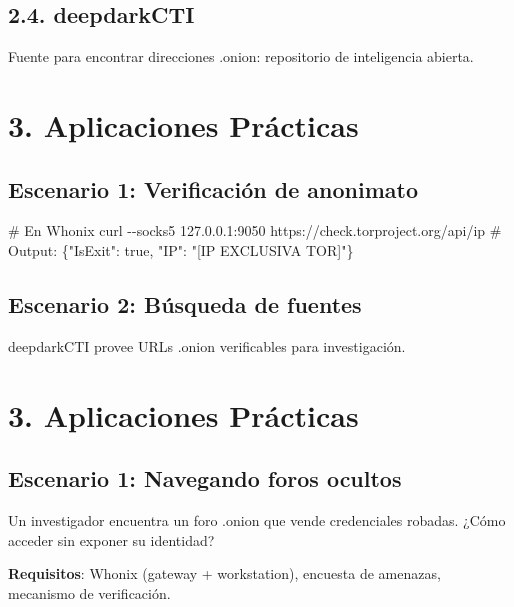 \documentclass[
  letterpaper,
]{report}
\newenvironment{Shaded}{\begin{snugshade}}{\end{snugshade}}
\newcommand{\AttributeTok}[1]{\textcolor[rgb]{0.40,0.45,0.13}{#1}}
\newcommand{\CommentTok}[1]{\textcolor[rgb]{0.37,0.37,0.37}{#1}}
\newcommand{\ExtensionTok}[1]{\textcolor[rgb]{0.00,0.23,0.31}{#1}}
\newcommand{\NormalTok}[1]{\textcolor[rgb]{0.00,0.23,0.31}{#1}}
\begin{document}
\subsection{2.4. deepdarkCTI}\label{deepdarkcti}

Fuente para encontrar direcciones .onion: repositorio de inteligencia
abierta.

\section{3. Aplicaciones Prácticas}\label{aplicaciones-pruxe1cticas}

\subsection{Escenario 1: Verificación de
anonimato}\label{escenario-1-verificaciuxf3n-de-anonimato}

\begin{Shaded}
\begin{Highlighting}[]
\CommentTok{\# En Whonix}
\ExtensionTok{curl} \AttributeTok{{-}{-}socks5}\NormalTok{ 127.0.0.1:9050 https://check.torproject.org/api/ip}
\CommentTok{\# Output: \{"IsExit": true, "IP": "[IP EXCLUSIVA TOR]"\}}
\end{Highlighting}
\end{Shaded}

\subsection{Escenario 2: Búsqueda de
fuentes}\label{escenario-2-buxfasqueda-de-fuentes}

deepdarkCTI provee URLs .onion verificables para investigación.

\section{3. Aplicaciones Prácticas}\label{aplicaciones-pruxe1cticas-1}

\subsection{Escenario 1: Navegando foros
ocultos}\label{escenario-1-navegando-foros-ocultos}

Un investigador encuentra un foro .onion que vende credenciales robadas.
¿Cómo acceder sin exponer su identidad?

\textbf{Requisitos}: Whonix (gateway + workstation), encuesta de
amenazas, mecanismo de verificación.
\end{document}
